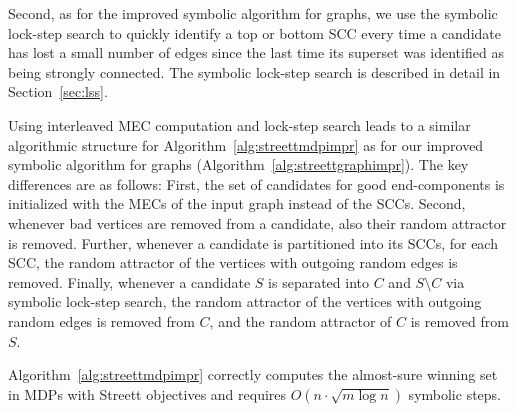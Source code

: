 \begin{compactitem}
\begin{compactitem}
\end{compactitem}
\item Second, as for the improved symbolic algorithm for graphs, we use 
the symbolic lock-step search to quickly identify a top or bottom SCC every time
a candidate has lost a small number of edges since the last time its superset
was identified as being strongly connected. The symbolic lock-step search
is described in detail in Section~\ref{sec:lss}.
\end{compactitem}

\vspace{2mm}
Using interleaved MEC computation and lock-step search leads to a similar algorithmic
structure for Algorithm~\ref{alg:streettmdpimpr} as for our improved symbolic algorithm for graphs
(Algorithm~\ref{alg:streettgraphimpr}). The key differences are as follows:
First, the set of candidates for good end-components is initialized with the MECs of
the input graph instead of the SCCs. Second, whenever bad vertices are removed
from a candidate, also their random attractor is removed.
Further, whenever a candidate is partitioned into its SCCs, for each SCC, the
random attractor of the vertices with outgoing random edges is removed.
Finally, whenever a candidate $S$ is separated into
$C$ and $S \setminus C$ via symbolic lock-step search, the random attractor of
the vertices with outgoing random edges is removed from $C$, and the random
attractor of $C$ is removed from $S$.

\begin{thm}\label{thm:improvedmdps}
Algorithm~\ref{alg:streettmdpimpr} correctly computes the almost-sure winning set
in MDPs with Streett objectives and requires \mbox{$O(n \cdot \sqrt{m \log n})$}
symbolic steps.
\end{thm}
